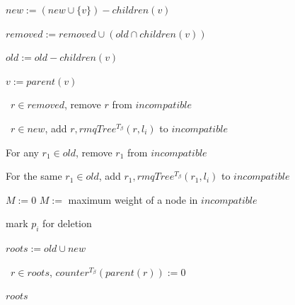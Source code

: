 \documentclass{article}
\newcommand{\weight}{\omega}
\newcommand{\TB}{T_\beta}
\begin{document}
\begin{algorithm}[H]
\begin{algorithmic}[1]
                        \State $new := (new \cup \{v\}) - children(v)$

                        \State $removed := removed \cup (old \cap children(v))$

                        \State $old := old - children(v)$

                        \State $v := parent(v)$
                    \EndWhile
                \EndFor

                \State \algorithmicforall\ $r \in removed$, remove $r$ from $incompatible$
                \label{step:removedrootsremoval}

                \State \algorithmicforall\ $r \in new$, add $r, rmqTree^{\TB}(r, l_i)$ to $incompatible$

                    \State For any $r_1 \in old$, remove $r_1$ from $incompatible$
                    \label{step:oldrootremoval}

                    \State For the same $r_1 \in old$, add $r_1, rmqTree^{\TB}(r_1, l_i)$ to $incompatible$
                \EndIf

                    {$M := 0$}
                    $M :=$ maximum weight of a node in $incompatible$

                \IIf{$\weight(p_i) \leq M$}
                    mark $p_i$ for deletion

                \State $roots := old \cup new$
            \EndFor

            \State \algorithmicforall\ $r \in roots$, $counter^{\TB}(parent(r)) := 0$

            \State \Return $roots$
        \end{algorithmic}
    \end{algorithm}
\end{document}
